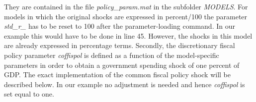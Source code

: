 \begin{itemize}
    They are contained in the file \textit{policy\_param.mat} in the subfolder \textit{MODELS}.
    For models in which the original shocks are expressed in percent/100 the parameter \textit{std\_r\_} has to be reset to 100
    after the parameter-loading command. In our example this would have to be done in line 45. However, the shocks in this model are
    already expressed in percentage terms. Secondly, the discretionary fiscal policy parameter \textit{coffispol} is defined as a function
    of the model-specific parameters in order to obtain a government spending shock of one percent of GDP. The exact
    implementation of the common fiscal policy shock will be described below. In our example no adjustment is
    needed and hence \textit{coffispol} is set equal to one.
\end{itemize}



